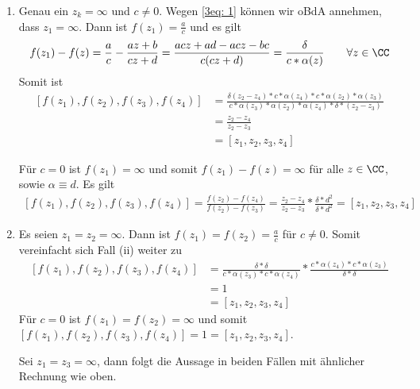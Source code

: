 \begin{exercisePage}
\begin{enumerate}[label=(zu \alph*), leftmargin=*]
\begin{enumerate}[label=(\roman*), leftmargin=*]
			\item Genau ein $z_k = \infty$ und $c \neq 0$. Wegen \eqref{3eq: 1} können wir oBdA annehmen, dass $z_1 = \infty$. Dann ist $f(z_1) = \frac{a}{c}$ und es gilt
			\begin{equation*}
				f(z_1) - f(z) = \frac{a}{c} - \frac{a z + b}{c z + d} 
				= \frac{ac z + ad - acz - bc}{c (c z + d)}
				= \frac{\delta}{c * \alpha(z)} \qquad \forall z \in \CC
			\end{equation*}
			Somit ist
			\begin{equation*}
				\begin{aligned}
					[f(z_1), f(z_2), f(z_3), f(z_4)] 
					&= \frac{\delta (z_2 - z_4) * c * \alpha(z_4) * c * \alpha(z_2) * \alpha(z_3)}{c * \alpha(z_3) * \alpha(z_2) * \alpha(z_4) * \delta * (z_2 - z_3)} \\
					&= \frac{z_2 - z_4}{z_2 - z_3} \\
					&= [z_1, z_2, z_3, z_4]
				\end{aligned}
			\end{equation*}
			
			Für $c = 0$ ist $f(z_1) = \infty$ und somit $f(z_1) - f(z) = \infty$ für alle $z \in \CC$, sowie $\alpha \equiv d$. Es gilt
			\begin{equation*}
				\begin{aligned}
					[f(z_1), f(z_2), f(z_3), f(z_4)] 
					= \frac{f(z_2) - f(z_4)}{f(z_2) - f(z_3)} 
					= \frac{z_2 - z_4}{z_2 - z_3} * \frac{\delta * d^2}{\delta * d^2}
					= [z_1, z_2, z_3, z_4]
				\end{aligned}
			\end{equation*}
			
			\item Es seien $z_1 = z_2 = \infty$. Dann ist $f(z_1) = f(z_2) = \frac{a}{c}$ für $c \neq 0$. Somit vereinfacht sich Fall (ii) weiter zu
			\begin{equation*}
				\begin{aligned}
					[f(z_1), f(z_2), f(z_3), f(z_4)] 
					&= \frac{\delta*\delta}{c * \alpha(z_3) * c * \alpha(z_4)} * \frac{c * \alpha(z_4) * c * \alpha(z_3)}{\delta * \delta} \\
					&= 1 \\
					&= [z_1, z_2, z_3, z_4]
				\end{aligned}
			\end{equation*}
			Für $c = 0$ ist $f(z_1) = f(z_2) = \infty$ und somit $[f(z_1), f(z_2), f(z_3), f(z_4)] = 1 = [z_1, z_2, z_3, z_4]$.
			
			Sei $z_1 = z_3 = \infty$, dann folgt die Aussage in beiden Fällen mit ähnlicher Rechnung wie oben.
			

\end{enumerate}
\end{enumerate}
\end{exercisePage}
